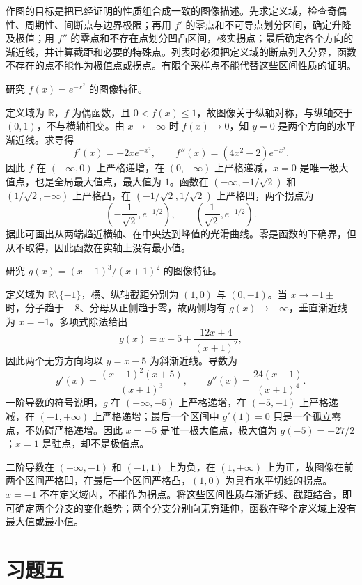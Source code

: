 作图的目标是把已经证明的性质组合成一致的图像描述。先求定义域，检查奇偶性、周期性、间断点与边界极限；再用 $f'$ 的零点和不可导点划分区间，确定升降及极值；用 $f''$ 的零点和不存在点划分凹凸区间，核实拐点；最后确定各个方向的渐近线，并计算截距和必要的特殊点。列表时必须把定义域的断点列入分界，函数不存在的点不能作为极值点或拐点。有限个采样点不能代替这些区间性质的证明。

\begin{example}
\label{ex:graphing-gaussian-function}
研究 $f(x)=e^{-x^2}$ 的图像特征。
\end{example}

\begin{solve}
定义域为 $\mathbb{R}$，$f$ 为偶函数，且 $0<f(x)\leq1$，故图像关于纵轴对称，与纵轴交于 $(0,1)$，不与横轴相交。由 $x\to\pm\infty$ 时 $f(x)\to0$，知 $y=0$ 是两个方向的水平渐近线。求导得
\[
    f'(x)=-2xe^{-x^2},\qquad
    f''(x)=(4x^2-2)e^{-x^2}.
\]
因此 $f$ 在 $(-\infty,0)$ 上严格递增，在 $(0,+\infty)$ 上严格递减，$x=0$ 是唯一极大值点，也是全局最大值点，最大值为 $1$。函数在 $(-\infty,-1/\sqrt2)$ 和 $(1/\sqrt2,+\infty)$ 上严格凸，在 $(-1/\sqrt2,1/\sqrt2)$ 上严格凹，两个拐点为
\[
    \left(-\frac1{\sqrt2},e^{-1/2}\right),\qquad
    \left(\frac1{\sqrt2},e^{-1/2}\right).
\]
据此可画出从两端趋近横轴、在中央达到峰值的光滑曲线。零是函数的下确界，但从不取得，因此函数在实轴上没有最小值。
\end{solve}

\begin{example}
\label{ex:graphing-rational-function}
研究 $g(x)=(x-1)^3/(x+1)^2$ 的图像特征。
\end{example}

\begin{solve}
定义域为 $\mathbb{R}\setminus\{-1\}$，横、纵轴截距分别为 $(1,0)$ 与 $(0,-1)$。当 $x\to-1\pm$ 时，分子趋于 $-8$、分母从正侧趋于零，故两侧均有 $g(x)\to-\infty$，垂直渐近线为 $x=-1$。多项式除法给出
\[
    g(x)=x-5+\frac{12x+4}{(x+1)^2},
\]
因此两个无穷方向均以 $y=x-5$ 为斜渐近线。导数为
\[
    g'(x)=\frac{(x-1)^2(x+5)}{(x+1)^3},\qquad
    g''(x)=\frac{24(x-1)}{(x+1)^4}.
\]
一阶导数的符号说明，$g$ 在 $(-\infty,-5)$ 上严格递增，在 $(-5,-1)$ 上严格递减，在 $(-1,+\infty)$ 上严格递增；最后一个区间中 $g'(1)=0$ 只是一个孤立零点，不妨碍严格递增。因此 $x=-5$ 是唯一极大值点，极大值为 $g(-5)=-27/2$；$x=1$ 是驻点，却不是极值点。

二阶导数在 $(-\infty,-1)$ 和 $(-1,1)$ 上为负，在 $(1,+\infty)$ 上为正，故图像在前两个区间严格凹，在最后一个区间严格凸，$(1,0)$ 为具有水平切线的拐点。$x=-1$ 不在定义域内，不能作为拐点。将这些区间性质与渐近线、截距结合，即可确定两个分支的变化趋势；两个分支分别向无穷延伸，函数在整个定义域上没有最大值或最小值。
\end{solve}

\section*{习题五}

